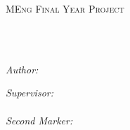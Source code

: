 \documentclass[
    11pt,
    oneside, %
    english,
    singlespacing, %
    headsepline, %
]{MastersDoctoralThesis}
\author{Nicolás \textsc{D'Cotta}} %
\theoremstyle{definition}
\begin{document}
    \setlength{\parskip}{\medskipamount}
    \setlength{\parindent}{0pt}

    \frontmatter
    \pagestyle{plain}


    \begin{titlepage}
        \begin{center}

            \vspace*{.06\textheight}
            {\scshape\LARGE \univname\par}\vspace{1.5cm}
            \textsc{\Large MEng Final Year Project}\\[0.5cm]

            \HRule \\[0.4cm]
            {\huge \bfseries \ttitle\par}\vspace{0.4cm} %
            \HRule \\[1.5cm]

            \begin{minipage}[t]{0.4\textwidth}
                \begin{flushleft}
                    \large
                    \emph{Author:}\\
                    \href{https://nico.dcotta.eu}{\authorname}
                \end{flushleft}
            \end{minipage}
            \begin{minipage}[t]{0.4\textwidth}
                \begin{flushright}
                    \large
                    \emph{Supervisor:} \\
                    \href{https://www.doc.ic.ac.uk/~wjk/}{\supname} \\[0.4 cm]
                    \emph{Second Marker:} \\
                    \href{https://www.imperial.ac.uk/people/paul.bilokon01}{\markername}
                \end{flushright}
            \end{minipage}\\[3cm]


\end{center}
\end{titlepage}
\end{document}
